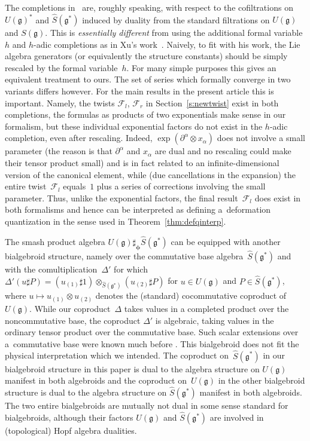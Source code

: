 \documentclass[10pt,a4paper]{amsart}
\def\gg{\mathfrak{g}}
\numberwithin{equation}{section}
\begin{document}
\begin{Remark}\label{rem:wcompl}
The completions in~\cite{halg} are, roughly speaking, with respect to the cofiltrations on $U(\gg)^*$ and $\hat{S}(\gg^*)$ induced by duality from the standard filtrations on $U(\gg)$ and $S(\gg)$. This is {\em essentially different} from using the additional formal variable $h$ and $h$-adic completions as in Xu's work~\cite{xu}. Naively, to fit with his work, the Lie algebra generators (or equivalently the structure constants)
should be simply rescaled by the formal variable~$h$. For many simple purposes this gives an equivalent treatment to ours. The set of series which formally converge in two variants differs however. For the main results in the present article this is important. Namely, the twists $\mathcal{F}_l$, $\mathcal{F}_r$ in Section~\ref{s:newtwist} exist in both completions, the formulas as products of two exponentials make sense in our formalism, but these individual exponential factors do not exist in the $h$-adic completion, even after rescaling. Indeed, $\exp(\partial^\alpha\otimes x_\alpha)$ does not involve a small parameter (the reason is that $\partial^\alpha$ and $x_\alpha$ are dual and no rescaling could make their tensor product small) and is in fact related to an infinite-dimensional version of the canonical element, while (due cancellations in the expansion) the entire twist~$\mathcal{F}_l$ equals~$1$ plus a series of corrections involving the small parameter. Thus, unlike the exponential factors, the final result~$\mathcal{F}_l$ does exist in both formalisms and hence can be interpreted as defining a~deformation quantization in the sense used in Theorem~\ref{thm:defqinterp}.
\end{Remark}
\begin{Remark}The smash product algebra $U(\gg)\sharp_{{\boldsymbol \phi}}\hat{S}(\gg^*)$ can be equipped with another bialgebroid structure, namely over the commutative base algebra~$\hat{S}(\gg^*)$ and with the comultiplication~$\Delta'$ for which $\Delta'(u\sharp P) = (u_{(1)}\sharp 1)\otimes_{\hat{S}(\gg^*)}(u_{(2)}\sharp P)$ for $u\in U(\gg)$ and $P\in\hat{S}(\gg^*)$, where $u\mapsto u_{(1)}\otimes u_{(2)}$ denotes the (standard) cocommutative coproduct of $U(\gg)$. While our co\-pro\-duct~$\Delta$ takes values in a completed product over the noncommutative base, the coproduct $\Delta'$ is algebraic, taking values in the ordinary tensor product over the commutative base. Such scalar extensions over a~commutative base were known much before \cite[pp.~117--118]{Sweedler}. This bialgebroid does not fit the physical interpretation which we intended. The coproduct on~$\hat{S}(\gg^*)$ in our bialgebroid structure in this paper is dual to the algebra structure on $U(\gg)$ manifest in both algebroids and the coproduct on~$U(\gg)$ in the other bialgebroid structure is dual to the algebra structure on $\hat{S}(\gg^*)$ manifest in both algebroids. The two entire bialgebroids are mutually not dual in some sense standard for bialgebroids, although their factors $U(\gg)$ and $\hat{S}(\gg^*)$ are involved in (topological) Hopf algebra dualities.
\end{Remark}
\end{document}
